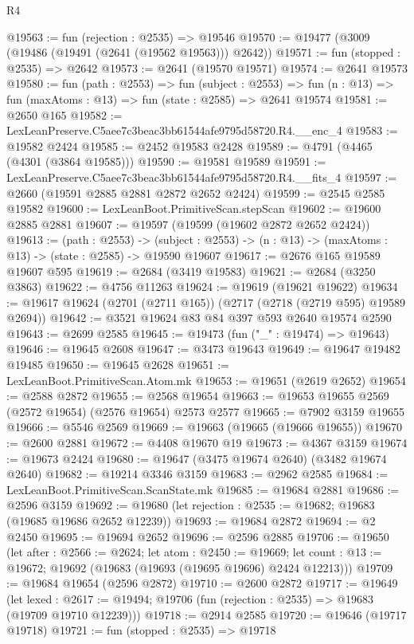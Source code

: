 \begin{lexlean}{R4}
\begin{coremodule}
@19563 := fun (rejection : @2535) => @19546
@19570 := @19477 (@3009 (@19486 (@19491 (@2641 (@19562 @19563))) @2642))
@19571 := fun (stopped : @2535) => @2642
@19573 := @2641 (@19570 @19571)
@19574 := @2641 @19573
@19580 := fun (path : @2553) =>
  fun (subject : @2553) =>
  fun (n : @13) => fun (maxAtoms : @13) => fun (state : @2585) => @2641 @19574
@19581 := @2650 @165
@19582 := LexLeanPreserve.C5aee7c3beac3bb61544afe9795d58720.R4.__enc_4
@19583 := @19582 @2424
@19585 := @2452 @19583 @2428
@19589 := @4791 (@4465 (@4301 (@3864 @19585)))
@19590 := @19581 @19589
@19591 := LexLeanPreserve.C5aee7c3beac3bb61544afe9795d58720.R4.__fits_4
@19597 := @2660 (@19591 @2885 @2881 @2872 @2652 @2424)
@19599 := @2545 @2585 @19582
@19600 := LexLeanBoot.PrimitiveScan.stepScan
@19602 := @19600 @2885 @2881
@19607 := @19597 (@19599 (@19602 @2872 @2652 @2424))
@19613 := (path : @2553) ->
  (subject : @2553) -> (n : @13) -> (maxAtoms : @13) -> (state : @2585) -> @19590 @19607
@19617 := @2676 @165 @19589 @19607 @595
@19619 := @2684 (@3419 @19583)
@19621 := @2684 (@3250 @3863)
@19622 := @4756 @11263
@19624 := @19619 (@19621 @19622)
@19634 := @19617 @19624 (@2701 (@2711 @165)) (@2717 (@2718 (@2719 @595) @19589 @2694))
@19642 := @3521 @19624 @83 @84 @397 @593 @2640 @19574 @2590
@19643 := @2699 @2585
@19645 := @19473 (fun ("_" : @19474) => @19643)
@19646 := @19645 @2608
@19647 := @3473 @19643
@19649 := @19647 @19482 @19485
@19650 := @19645 @2628
@19651 := LexLeanBoot.PrimitiveScan.Atom.mk
@19653 := @19651 (@2619 @2652)
@19654 := @2588 @2872
@19655 := @2568 @19654
@19663 := @19653 @19655 @2569 (@2572 @19654) (@2576 @19654) @2573 @2577
@19665 := @7902 @3159 @19655
@19666 := @5546 @2569
@19669 := @19663 (@19665 (@19666 @19655))
@19670 := @2600 @2881
@19672 := @4408 @19670 @19
@19673 := @4367 @3159
@19674 := @19673 @2424
@19680 := @19647 (@3475 @19674 @2640) (@3482 @19674 @2640)
@19682 := @19214 @3346 @3159
@19683 := @2962 @2585
@19684 := LexLeanBoot.PrimitiveScan.ScanState.mk
@19685 := @19684 @2881
@19686 := @2596 @3159
@19692 := @19680 (let rejection : @2535 := @19682; @19683 (@19685 @19686 @2652 @12239))
@19693 := @19684 @2872
@19694 := @2 @2450
@19695 := @19694 @2652
@19696 := @2596 @2885
@19706 := @19650
    (let after : @2566 := @2624;
    let atom : @2450 := @19669;
    let count : @13 := @19672; @19692 (@19683 (@19693 (@19695 @19696) @2424 @12213)))
@19709 := @19684 @19654 (@2596 @2872)
@19710 := @2600 @2872
@19717 := @19649
    (let lexed : @2617 := @19494; @19706 (fun (rejection : @2535) => @19683 (@19709 @19710 @12239)))
@19718 := @2914 @2585
@19720 := @19646 (@19717 @19718)
@19721 := fun (stopped : @2535) => @19718

\end{coremodule}
\end{lexlean}
